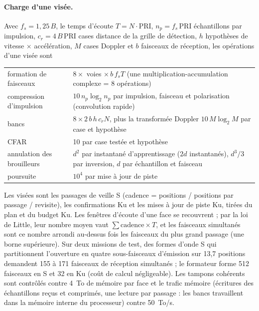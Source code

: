 \documentclass[11pt,a4paper]{article}
\begin{document}
\paragraph{Charge d'une visée.} Avec $f_s = 1,25\,B$, le temps d'écoute $T = N\cdot\mathrm{PRI}$,
$n_p = f_s\,\mathrm{PRI}$ échantillons par impulsion, $c_r = 4\,B\,\mathrm{PRI}$ cases distance de la grille de
détection, $h$ hypothèses de vitesse $\times$ accélération, $M$ cases Doppler et $b$ faisceaux de réception, les
opérations d'une visée sont
\begin{center}
\begin{tabularx}{\linewidth}{@{}lL@{}}
\toprule
formation de faisceaux & $8\times$ voies $\times\, b\, f_s T$ (une multiplication-accumulation complexe = 8 opérations)\\
compression d'impulsion & $10\, n_p\log_2 n_p$ par impulsion, faisceau et polarisation (convolution rapide)\\
bancs & $8\times 2\, b\, h\, c_r N$, plus la transformée Doppler $10\,M\log_2 M$ par case et hypothèse\\
CFAR & 10 par case testée et hypothèse\\
annulation des brouilleurs & $d^2$ par instantané d'apprentissage ($2d$ instantanés), $d^3/3$ par inversion, $d$ par
échantillon et faisceau\\
poursuite & $10^4$ par mise à jour de piste\\
\bottomrule
\end{tabularx}
\end{center}
Les visées sont les passages de veille S (cadence = positions / positions par passage / revisite), les confirmations Ku
et les mises à jour de piste Ku, tirées du plan et du budget Ku. Les fenêtres d'écoute d'une face se recouvrent ; par la
loi de Little, leur nombre moyen vaut $\sum \text{cadence}\times T$, et les faisceaux simultanés sont ce nombre arrondi
au-dessus fois les faisceaux du plus grand passage (une borne supérieure). Sur deux missions de test, des formes d'onde
S qui partitionnent l'ouverture en quatre sous-faisceaux d'émission sur 13,7 positions demandent 155 à 171 faisceaux de
réception simultanés ; le formateur forme 512 faisceaux en S et 32 en Ku (coût de calcul négligeable). Les tampons
cohérents sont contrôlés contre \SI{4}{To} de mémoire par face et le trafic mémoire (écritures des échantillons reçus
et comprimés, une lecture par passage : les bancs travaillent dans la mémoire interne du processeur) contre
\SI{50}{To/s}.
\end{document}

